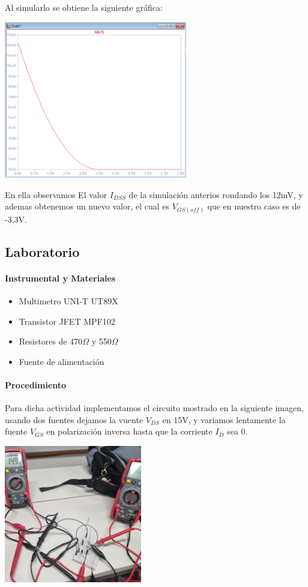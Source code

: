 Al simularlo se obtiene la siguiente gráfica:

\includegraphics[width=8cm]{./imagenes/Sim2.png}

En ella observamos El valor $I_{DSS}$ de la simulación anterios rondando los 12mV, y ademas obtenemos un nuevo valor, el cual es $V_{GS(off)}$ que en nuestro caso es de -3,3V.

\subsection{Laboratorio}

\paragraph{Instrumental y Materiales}
\begin{itemize}
    \item Multimetro UNI-T UT89X
    \item Transistor JFET MPF102
    \item Resistores de 470$\Omega$ y 550$\Omega$
    \item Fuente de alimentación
\end{itemize}

\paragraph{Procedimiento}

Para dicha actividad implementamos el circuito mostrado en la siguiente imagen, usando dos fuentes dejamos la vuente $V_{DS}$ en 15V, y variamos lentamente la fuente $V_{GS}$ en polarización inversa hasta que la corriente $I_D$ sea 0.

\includegraphics[width=6cm]{./imagenes/Lab2.jpg}

